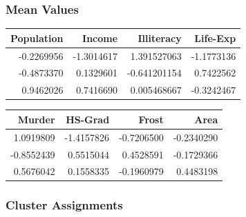 \documentclass[11pt]{article}
\begin{document}
\subsubsection*{Mean Values}
\label{sec:orga36e8b5}

\begin{center}
\begin{tabular}{rrrr}
Population & Income & Illiteracy & Life-Exp\\
\hline
-0.2269956 & -1.3014617 & 1.391527063 & -1.1773136\\
-0.4873370 & 0.1329601 & -0.641201154 & 0.7422562\\
0.9462026 & 0.7416690 & 0.005468667 & -0.3242467\\
\end{tabular}
\end{center}

\begin{center}
\begin{tabular}{rrrr}
Murder & HS-Grad & Frost & Area\\
\hline
1.0919809 & -1.4157826 & -0.7206500 & -0.2340290\\
-0.8552439 & 0.5515044 & 0.4528591 & -0.1729366\\
0.5676042 & 0.1558335 & -0.1960979 & 0.4483198\\
\end{tabular}
\end{center}

\subsubsection*{Cluster Assignments}
\label{sec:org8759f22}
\end{document}
